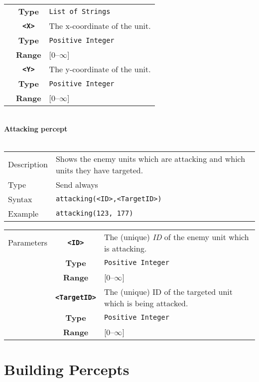 \begin{tabularx}{\textwidth}{l | c | p{8cm}|}
            & \textbf{Type} & \verb|List of Strings| \\
            \cline{2-3}
            & \textbf{\verb|<X>|} & The x-coordinate of the unit.\\
            & \textbf{Type} & \verb|Positive Integer| \\
            & \textbf{Range} & [0--$\infty$] \\
            \cline{2-3}
            & \textbf{\verb|<Y>|} & The y-coordinate of the unit.\\
            & \textbf{Type} & \verb|Positive Integer| \\
            & \textbf{Range} & [0--$\infty$] \\
            \cline{2-3}
\end{tabularx}\\

\newpage
\noindent
\textbf{Attacking percept}\\
\\
\begin{tabularx}{\textwidth}{lX}
 Description & Shows the enemy units which are attacking and which units they have targeted. \\
 Type & Send always \\
 Syntax & \verb|attacking(<ID>,<TargetID>)| \\
 Example & \verb|attacking(123, 177)| \\
 \end{tabularx}
 \begin{tabularx}{\textwidth}{l | c | p{8cm}|}
 \cline{2-3}
 Parameters & \textbf{\verb|<ID>|} & The (unique) \textit{ID} of the enemy unit which is attacking. \\
            & \textbf{Type} & \verb|Positive Integer| \\
            & \textbf{Range} & [0--$\infty$] \\
            \cline{2-3}
            & \textbf{\verb|<TargetID>|} & The (unique) ID of the targeted unit which is being attacked. \\
            & \textbf{Type} & \verb|Positive Integer| \\
            & \textbf{Range} & [0--$\infty$] \\
            \cline{2-3}
\end{tabularx}

\section{Building Percepts}

